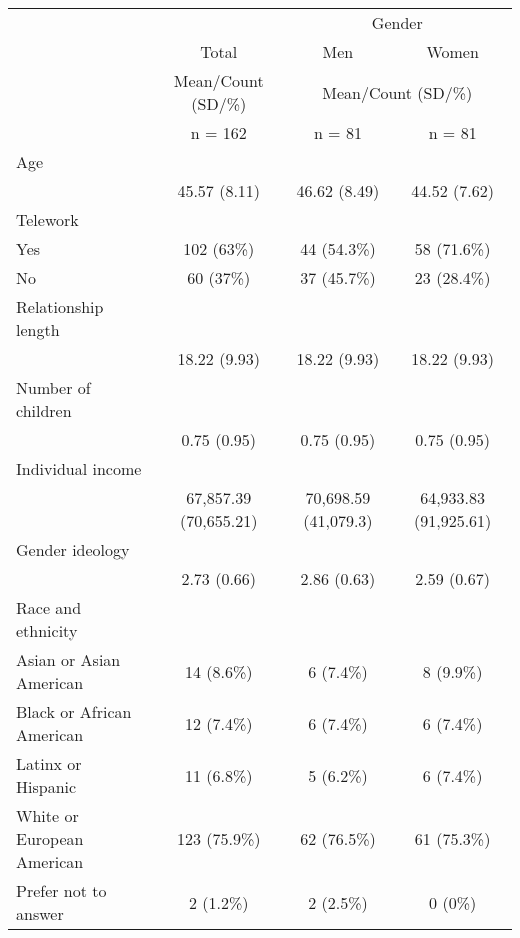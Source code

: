 \documentclass[
  english,
  man]{apa6}
\begin{document}
\begin{table}[ ht ] 
\centering 
\caption{}\label{}
\begin{tabular}{ l c c c }
\toprule
 &   &  \multicolumn{ 2 }{c}{ Gender }\\ 
  & Total & Men & Women \\ 
& Mean/Count (SD/\%)  &  \multicolumn{ 2 }{c}{ Mean/Count (SD/\%) }\\
 & n = 162 & n = 81 & n = 81 \\ 
 \midrule
Age &   &   &  \\ 
\hspace{6pt}   & 45.57 (8.11) & 46.62 (8.49) & 44.52 (7.62)\\ 
Telework &   &   &  \\ 
\hspace{6pt}    Yes & 102 (63\%) & 44 (54.3\%) & 58 (71.6\%)\\ 
\hspace{6pt}    No & 60 (37\%) & 37 (45.7\%) & 23 (28.4\%)\\ 
Relationship length &   &   &  \\ 
\hspace{6pt}   & 18.22 (9.93) & 18.22 (9.93) & 18.22 (9.93)\\ 
Number of children &   &   &  \\ 
\hspace{6pt}   & 0.75 (0.95) & 0.75 (0.95) & 0.75 (0.95)\\ 
Individual income &   &   &  \\ 
\hspace{6pt}   & 67,857.39 (70,655.21) & 70,698.59 (41,079.3) & 64,933.83 (91,925.61)\\ 
Gender ideology &   &   &  \\ 
\hspace{6pt}   & 2.73 (0.66) & 2.86 (0.63) & 2.59 (0.67)\\ 
Race and ethnicity &   &   &  \\ 
\hspace{6pt}    Asian or Asian American & 14 (8.6\%) & 6 (7.4\%) & 8 (9.9\%)\\ 
\hspace{6pt}    Black or African American & 12 (7.4\%) & 6 (7.4\%) & 6 (7.4\%)\\ 
\hspace{6pt}    Latinx or Hispanic & 11 (6.8\%) & 5 (6.2\%) & 6 (7.4\%)\\ 
\hspace{6pt}    White or European American & 123 (75.9\%) & 62 (76.5\%) & 61 (75.3\%)\\ 
\hspace{6pt}    Prefer not to answer & 2 (1.2\%) & 2 (2.5\%) & 0 (0\%)\\ 
\bottomrule

\end{tabular}
\end{table}
\end{document}
